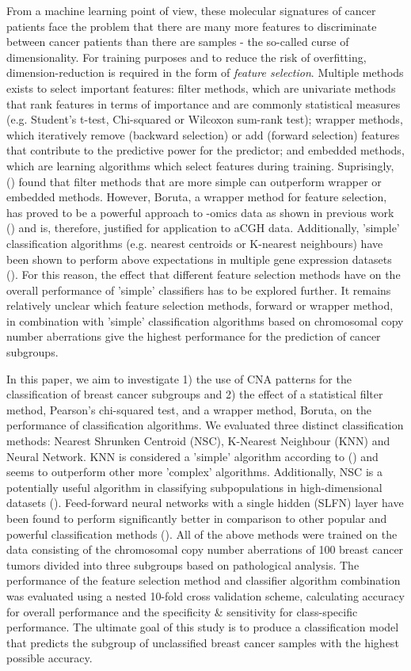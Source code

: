     From a machine learning point of view, these molecular signatures of cancer patients face the problem that there are many more features to discriminate between cancer patients than there are samples -  the so-called curse of dimensionality. For training purposes and to reduce the risk of overfitting, dimension-reduction is required in the form of \textit{feature selection}. Multiple methods exists to select important features: filter methods, which are univariate methods that rank features in terms of importance and are commonly statistical measures (e.g. Student's t-test, Chi-squared or Wilcoxon sum-rank test); wrapper methods, which iteratively remove (backward selection) or add (forward selection) features that contribute to the predictive power for the predictor; and embedded methods, which are learning algorithms which select features during training. Suprisingly, (\citealp{Haury2011}) found that filter methods that are more simple can outperform wrapper or embedded methods. However, Boruta, a wrapper method for feature selection, has proved to be a powerful approach to -omics data as shown in previous work (\citealp{degenhardt2019}) and is, therefore, justified for application to aCGH data. Additionally, 'simple' classification algorithms (e.g. nearest centroids or K-nearest neighbours) have been shown to perform above expectations in multiple gene expression datasets (\citealp{Haury2011,Wessels2005}). For this reason, the effect that different feature selection methods have on the overall performance of 'simple' classifiers has to be explored further. It remains relatively unclear which feature selection methods, forward or wrapper method, in combination with 'simple' classification algorithms based on chromosomal copy number aberrations give the highest performance for the prediction of cancer subgroups.

    In this paper, we aim to investigate 1) the use of CNA patterns for the classification of breast cancer subgroups and 2) the effect of a statistical filter method, Pearson’s chi-squared test, and a wrapper method, Boruta, on the performance of classification algorithms. We evaluated three distinct classification methods: Nearest Shrunken Centroid (NSC), K-Nearest Neighbour (KNN) and Neural Network. KNN is considered a 'simple' algorithm according to (\citealp{Haury2011}) and seems to outperform other more 'complex' algorithms. Additionally, NSC is a potentially useful algorithm in classifying subpopulations in high-dimensional datasets (\citealp{tibshirani2003}). Feed-forward neural networks with a single hidden (SLFN) layer have been found to perform significantly better in comparison to other popular and powerful classification methods (\citealp{huynh2007}). All of the above methods were trained on the data consisting of the chromosomal copy number aberrations of 100 breast cancer tumors divided into three subgroups based on pathological analysis. The performance of the feature selection method and classifier algorithm combination was evaluated using a nested 10-fold cross validation scheme, calculating accuracy for overall performance and the specificity \& sensitivity for class-specific performance. The ultimate goal of this study is to produce a classification model that predicts the subgroup of unclassified breast cancer samples with the highest possible accuracy.